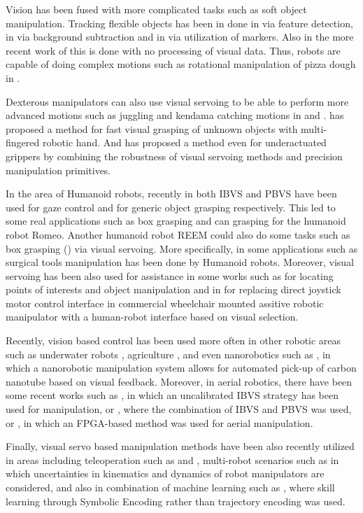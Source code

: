 Vision has been fused with more complicated tasks such as soft object manipulation. Tracking flexible objects has been in done in \cite{salzmann2007deformable} via feature detection, in \cite{schulman2013tracking} via background subtraction and in \cite{elbrechter2011bi} via utilization of markers. Also in the more recent work of \cite{bodenhagen2014adaptable} this is done with no processing of visual data. Thus, robots are capable of doing complex motions such as rotational manipulation of pizza dough in \cite{yamakawa2013dynamic}. \par 
Dexterous manipulators can also use visual servoing to be able to perform more advanced motions such as juggling and kendama catching motions in \cite{kizaki2012two} and \cite{namiki2014ball}. \cite{lippiello2013visual} has proposed a method for fast visual grasping of unknown objects with multi-fingered robotic hand. And \cite{calli2016vision} has proposed a method even for underactuated grippers by combining the robustness of visual servoing methods and precision manipulation primitives. \par 
In the area of Humanoid robots, recently in \cite{claudio2016vision} both IBVS and PBVS have been used for gaze control and for generic object grasping respectively. This led to some real applications such as box grasping and can grasping for the humanoid robot Romeo. Another humanoid robot REEM could also do some tasks such as box grasping (\cite{agravante2013visual}) via visual servoing. More specifically, in \cite{tan2015integrated} some applications such as surgical tools manipulation has been done by Humanoid robots. Moreover, visual servoing has been also used for assistance in some works such as \cite{troniak2013charlie} for locating points of interests and object manipulation and in \cite{quintero2015vibi} for replacing direct joystick motor control interface in commercial wheelchair mounted assitive robotic manipulator with a human-robot interface based on visual selection. \par 
Recently, vision based control has been used more often in other robotic areas such as underwater robots \cite{huang2016underwater}, agriculture \cite{michaels2015vision}, and even nanorobotics such as \cite{shi2017vision}, in which a nanorobotic manipulation system allows for automated pick-up of carbon nanotube based on visual feedback. Moreover, in aerial robotics, there have been some recent works such as \cite{santamaria2017uncalibrated}, in which an uncalibrated IBVS strategy has been used for manipulation, or \cite{lippiello2016hybrid}, where the combination of IBVS and PBVS was used, or \cite{suphachart2016vision}, in which an FPGA-based method was used for aerial manipulation. \par 
Finally, visual servo based manipulation methods have been also recently utilized in areas including teleoperation such as \cite{selvaggio2016vision} and \cite{chenf2016framework}, multi-robot scenarios such as \cite{wang2016image} in which uncertainties in kinematics and dynamics of robot manipulators are considered, and also in combination of machine learning such as \cite{das2016learning}, where skill learning through Symbolic Encoding rather than trajectory encoding was used. 